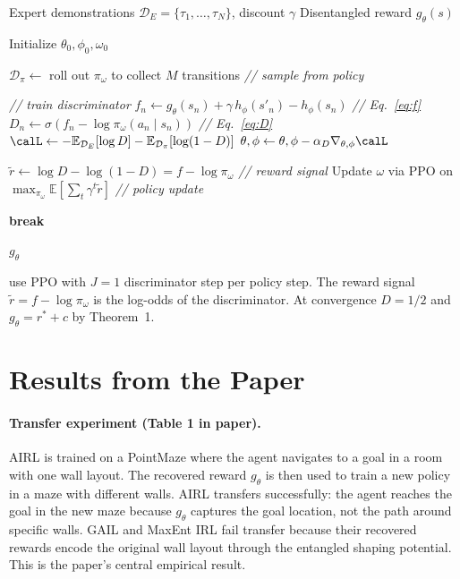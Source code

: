 \documentclass[11pt]{article}
\newcommand{\E}{\mathbb{E}}
\newcommand{\calD}{\mathcal{D}}
\begin{document}
\begin{algorithm}[h!]
\caption{AIRL (Fu et al.\ 2018, Algorithm 1)}
\label{alg:airl}
\begin{algorithmic}[1]
\REQUIRE Expert demonstrations $\calD_E = \{\tau_1, \ldots, \tau_N\}$, discount $\gamma$
\ENSURE Disentangled reward $g_\theta(s)$

\STATE Initialize $\theta_0, \phi_0, \omega_0$


\STATE $\calD_\pi \leftarrow$ roll out $\pi_\omega$ to collect $M$ transitions \hfill \textit{// sample from policy}

 \hfill \textit{// train discriminator}
  \STATE $f_n \leftarrow g_\theta(s_n) + \gamma\, h_\phi(s'_n) - h_\phi(s_n)$ \hfill \textit{// Eq.~\eqref{eq:f}}
  \STATE $D_n \leftarrow \sigma(f_n - \log \pi_\omega(a_n \mid s_n))$ \hfill \textit{// Eq.~\eqref{eq:D}}
  \STATE $\calL \leftarrow -\E_{\calD_E}[\log D] - \E_{\calD_\pi}[\log(1-D)]$
  \STATE $\theta, \phi \leftarrow \theta, \phi - \alpha_D \nabla_{\theta,\phi} \calL$
\ENDFOR

\STATE $\tilde{r} \leftarrow \log D - \log(1-D) = f - \log \pi_\omega$ \hfill \textit{// reward signal}
\STATE Update $\omega$ via PPO on $\max_{\pi_\omega} \E[\sum_t \gamma^t \tilde{r}]$ \hfill \textit{// policy update}

  \STATE \textbf{break}
\ENDIF

\ENDFOR
\RETURN $g_\theta$ 
\end{algorithmic}
\end{algorithm}
\FloatBarrier

\citet{fu2018} use PPO \citep{schulman2017} with $J = 1$ discriminator step per policy step.
The reward signal $\tilde{r} = f - \log \pi_\omega$ is the log-odds of the discriminator.
At convergence $D = 1/2$ and $g_\theta = r^* + c$ by Theorem~1.

\section{Results from the Paper}

\paragraph{Transfer experiment (Table 1 in paper).}
AIRL is trained on a PointMaze where the agent navigates to a goal in a room with one wall layout.
The recovered reward $g_\theta$ is then used to train a new policy in a maze with different walls.
AIRL transfers successfully: the agent reaches the goal in the new maze because $g_\theta$ captures the goal location, not the path around specific walls.
GAIL and MaxEnt IRL fail transfer because their recovered rewards encode the original wall layout through the entangled shaping potential.
This is the paper's central empirical result.
\end{document}
